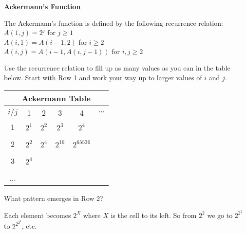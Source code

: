 \documentclass[12pt]{article}
\begin{document}
\newcommand{\I}{\mbox{{\em Int}}}
\newcommand{\lt}{\mbox{{\em left}}}
\newcommand{\rt}{\mbox{{\em right}}}
\newcommand{\ld}{\Delta^l}
\newcommand{\rd}{\Delta^r}
\newcommand{\lsp}[1]{\large\renewcommand{\baselinestretch}{#1}\normalsize}
\newcommand{\hsp}{\hspace{.2in}}

\def\Endwhile{\mbox{\bf endwhile\ }}
\def\Or{\mbox{\bf or\ }}
\def\Do{\mbox{\bf do\ }}
\def\Downto{\mbox{\bf downto\ }}
\def\Int{\mbox{\bf int\ }}
\def\To{\mbox{\bf to\ }}
\def\Repeat{\mbox{\bf repeat\ }}
\def\Until{\mbox{\bf until\ }}
\def\Return{\mbox{\bf return\ }}
\def\Not{\mbox{\bf not\ }}
\def\And{\mbox{\bf and\ }}
\def\For{\mbox{\bf for\ }}
\def\Foreach{\mbox{\bf foreach\ }}
\def\Else{\mbox{\bf else\ }}
\def\Elseif{\mbox{\bf elseif\ }}
\def\End{\mbox{\bf end\ }}
\def\If{\mbox{\bf if\ }}
\def\Mod{\mbox{\bf \ mod\ }}
\def\Then{\mbox{\bf then\ }}
\def\While{\mbox{\bf while\ }}
\def\Output{\mbox{\bf output\ }}


\lsp{1}
\pagestyle{plain}
\begin{center}
{\bf
Ackermann's Function
}
\end{center}

The Ackermann's function is defined by the following recurrence
relation:\\
$A(1,j) = 2^j$ for $j \ge 1$\\
$A(i,1) = A(i-1,2)$ for $i \ge 2$\\
$A(i,j) = A(i-1,A(i,j-1))$ for $i,j \ge 2$

\vspace*{0.5in}
Use the recurrence relation to fill up as many values as you can 
in the table below. Start with Row 1 and work your way up to 
larger values of $i$ and $j$.
\vspace*{0.5in}

\begin{tabular}{|c|c|c|c|c|c}\hline
\multicolumn{6}{|c}{Ackermann Table}\\\hline
$i/j$ & 1 & 2 & 3 & 4 & $\cdots$ \\ \hline
1   &   $2^1$ &   $2^2$ &   $2^3$ &  $2^4$ &     \\
    &     &     &     &     &     \\  \hline
2   &   $2^2$ &  $2^4$ &   $2^{16}$  &    $2^{65536}$ &     \\
    &     &     &     &     &     \\ \hline
3   &  $2^4$ &  &   &   &     \\
    &    &  &   &   &     \\ \hline
... &   \hspace*{0.5in}  & \hspace*{0.5in}  &  \hspace*{0.5in}  &  \hspace*{0.5in}  &     \\
\end{tabular}

\vspace*{0.5in}
What pattern emerges in Row 2?

Each element becomes $2^X$ where $X$ is the cell to its left. So from $2^2$ we go to $2^{2^2}$ to $2^{2^{2^2}}$, etc.
\end{document}
